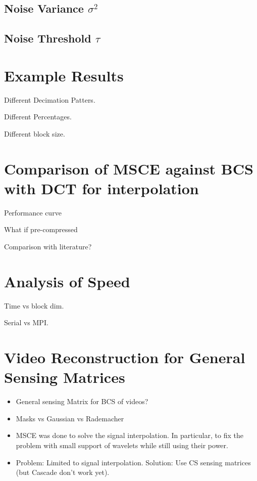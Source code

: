\subsection{Noise Variance \texorpdfstring{$\sigma^2$}{[sigma2]}}



\subsection{Noise Threshold \texorpdfstring{$\tau$}{[tau]}}

\section{Example Results}
Different Decimation Patters. 

Different Percentages. 

Different block size.

\section{Comparison of MSCE against BCS with DCT for interpolation}
Performance curve

What if pre-compressed

Comparison with literature?

\section{Analysis of Speed}
Time vs block dim.

Serial vs MPI.


\section{Video Reconstruction for General Sensing Matrices}

\begin{itemize}
\item General sensing Matrix for BCS of videos?
\item Masks vs Gaussian vs Rademacher
\item MSCE was done to solve the signal interpolation. In particular, to fix the problem with small support of wavelets while still using their power.
\item Problem: Limited to signal interpolation. Solution: Use CS sensing matrices (but Cascade don't work yet).
\end{itemize}
